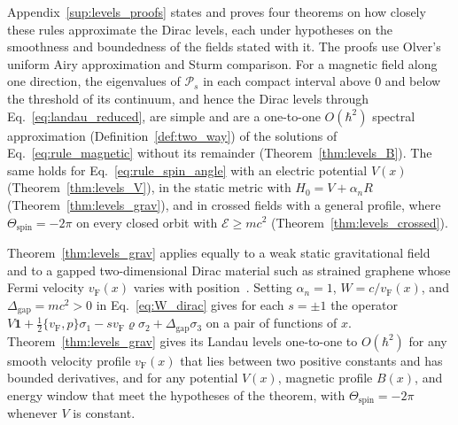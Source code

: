 \documentclass[aps,prd,onecolumn,tightenlines,nofootinbib,notitlepage,11pt,floatfix]{revtex4-2}
\theoremstyle{indentedtheorem}
\begin{document}
Appendix~\ref{sup:levels_proofs} states and proves four theorems on how closely these rules approximate the Dirac levels, each under hypotheses on the smoothness and boundedness of the fields stated with it. The proofs use Olver's uniform Airy approximation and Sturm comparison. For a magnetic field along one direction, the eigenvalues of $\mathcal{P}_s$ in each compact interval above $0$ and below the threshold of its continuum, and hence the Dirac levels through Eq.~\eqref{eq:landau_reduced}, are simple and are a one-to-one $O(\hbar^2)$ spectral approximation (Definition~\ref{def:two_way}) of the solutions of Eq.~\eqref{eq:rule_magnetic} without its remainder (Theorem~\ref{thm:levels_B}). The same holds for Eq.~\eqref{eq:rule_spin_angle} with an electric potential $V(x)$ (Theorem~\ref{thm:levels_V}), in the static metric with $H_0=V+\alpha_nR$ (Theorem~\ref{thm:levels_grav}), and in crossed fields with a general profile, where $\Theta_\text{spin}=-2\pi$ on every closed orbit with $\mathcal{E}\geq mc^2$ (Theorem~\ref{thm:levels_crossed}).

Theorem~\ref{thm:levels_grav} applies equally to a weak static gravitational field and to a gapped two-dimensional Dirac material such as strained graphene whose Fermi velocity $v_\text{F}(x)$ varies with position~\citep{deJuanSturlaVozmediano2012Space}. Setting $\alpha_n=1$, $W=c/v_\text{F}(x)$, and $\Delta_\text{gap}=mc^2>0$ in Eq.~\eqref{eq:W_dirac} gives for each $s=\pm1$ the operator $V\mathbf{1}+\tfrac{1}{2}\{v_\text{F},\hat{p}\}\sigma_1-sv_\text{F}\varrho\sigma_2+\Delta_\text{gap}\sigma_3$ on a pair of functions of $x$. Theorem~\ref{thm:levels_grav} gives its Landau levels one-to-one to $O(\hbar^2)$ for any smooth velocity profile $v_\text{F}(x)$ that lies between two positive constants and has bounded derivatives, and for any potential $V(x)$, magnetic profile $B(x)$, and energy window that meet the hypotheses of the theorem, with $\Theta_\text{spin}=-2\pi$ whenever $V$ is constant.
\end{document}
